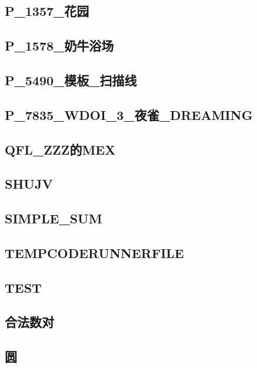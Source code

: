 \subsection{P_1357_花园}
\raggedbottom
\hrulefill

\subsection{P_1578_奶牛浴场}
\raggedbottom
\hrulefill

\subsection{P_5490_模板_扫描线}
\raggedbottom
\hrulefill

\subsection{P_7835_WDOI_3_夜雀_DREAMING}
\raggedbottom
\hrulefill

\subsection{QFL_ZZZ的MEX}
\raggedbottom
\hrulefill

\subsection{SHUJV}
\raggedbottom
\hrulefill

\subsection{SIMPLE_SUM}
\raggedbottom
\hrulefill

\subsection{TEMPCODERUNNERFILE}
\raggedbottom
\hrulefill

\subsection{TEST}
\raggedbottom
\hrulefill

\subsection{合法数对}
\raggedbottom
\hrulefill

\subsection{圆}
\raggedbottom
\hrulefill

